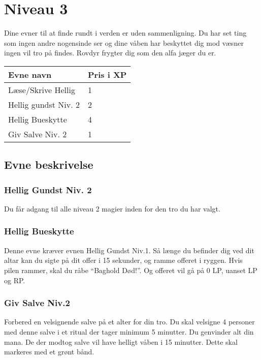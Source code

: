 \chapter{Niveau 3}

Dine evner til at finde rundt i verden er uden sammenligning. Du har set ting som ingen andre nogensinde ser og dine våben har beskyttet dig mod væsner ingen vil tro på findes. Rovdyr frygter dig som den alfa jæger du er.

\begin{table}[H]
    \centering
    \begin{tabular}{|p{}|p{}|}
    \rowcolor{cerulean!80}\hline
        Evne navn & Pris i XP \\\hline
        Læse/Skrive Hellig & 1\\\hline
        Hellig gundst Niv. 2 &2\\\hline
        Hellig Bueskytte & 4\\\hline
        Giv Salve Niv. 2 & 1\\\hline
    \end{tabular}
\end{table}
\section{Evne beskrivelse}




\subsection{Hellig Gundst Niv. 2}
Du får adgang til alle niveau 2 magier inden for den tro du har valgt.

\subsection{Hellig Bueskytte}
Denne evne kræver evnen Hellig Gundst Niv.1. Så længe du befinder dig ved dit altar kan du sigte på dit offer i 15 sekunder, og ramme offeret i ryggen. Hvis pilen rammer, skal du råbe “Baghold Død!”. Og offeret vil gå på 0 LP, uanset LP og RP.

\subsection{Giv Salve Niv.2}
Forbered en velsignende salve på et alter for din tro. Du skal velsigne 4 personer med denne salve i et ritual der tager minimum 5 minutter. Du genvinder alt din mana. De der modtog salve vil have helligt våben i 15 minutter. Dette skal markeres med et grønt bånd.